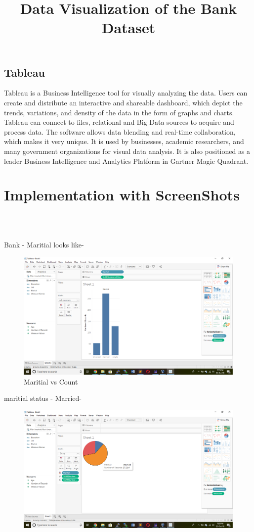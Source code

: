 \begin{itemize}
\subsection{Tableau}
Tableau is a Business Intelligence tool for visually analyzing the data. Users can create and distribute an interactive and shareable dashboard, which depict the trends, variations, and density of the data in the form of graphs and charts. Tableau can connect to files, relational and Big Data sources to acquire and process data. The software allows data blending and real-time collaboration, which makes it very unique. It is used by businesses, academic researchers, and many government organizations for visual data analysis. It is also positioned as a leader Business Intelligence and Analytics Platform in Gartner Magic Quadrant.

\section{Implementation with ScreenShots}
\\
\title{Data Visualization of the Bank Dataset}
\\
%
 Bank - Maritial looks like-
\begin{figure}[h!]
	\centering
	\includegraphics[width=\linewidth]{sc1.png}
	\caption{Maritial vs Count}
\end{figure}
%
%
maritial status - Married-
\begin{figure}[h!]
	\centering
	\includegraphics[width=\linewidth]{sc2.png}

\end{figure}
\end{itemize}
